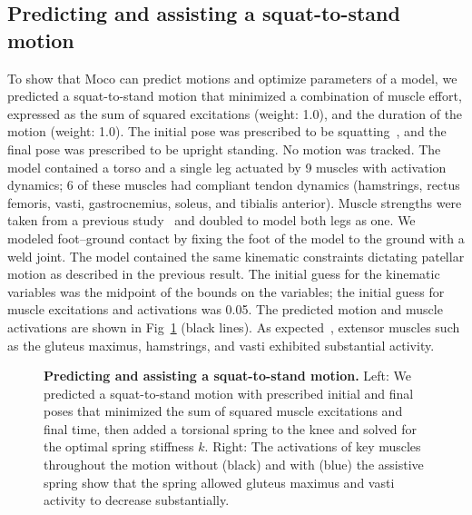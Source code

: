 \documentclass[10pt,letterpaper]{article}
\begin{document}
\subsection*{Predicting and assisting a squat-to-stand motion}

To show that Moco can predict motions and optimize parameters of a model, we predicted a squat-to-stand motion that minimized a combination of muscle effort, expressed as the sum of squared excitations (weight: 1.0), and the duration of the motion (weight: 1.0). The initial pose was prescribed to be squatting~\cite{Fregly:2015}, and the final pose was prescribed to be upright standing. No motion was tracked. The model contained a torso and a single leg actuated by 9 muscles with activation dynamics; 6 of these muscles had compliant tendon dynamics (hamstrings, rectus femoris, vasti, gastrocnemius, soleus, and tibialis anterior). Muscle strengths were taken from a previous study~\cite{Ong:2019} and doubled to model both legs as one. We modeled foot--ground contact by fixing the foot of the model to the ground with a weld joint. The model contained the same kinematic constraints dictating patellar motion as described in the previous result. The initial guess for the kinematic variables was the midpoint of the bounds on the variables; the initial guess for muscle excitations and activations was 0.05. The predicted motion and muscle activations are shown in Fig~\ref{squattostand} (black lines). As expected~\cite{Yavuz:2017}, extensor muscles such as the gluteus maximus, hamstrings, and vasti exhibited substantial activity.

\begin{figure}[!h]
        \centering
        \caption{{\bf Predicting and assisting a squat-to-stand motion.}
            Left: We predicted a squat-to-stand motion with prescribed initial and final poses that minimized the sum of squared muscle excitations and final time, then added a torsional spring to the knee and solved for the optimal spring stiffness $k$. Right: The activations of key muscles throughout the motion without (black) and with (blue) the assistive spring show that the spring allowed gluteus maximus and vasti activity to decrease substantially.
        }
        \label{squattostand}
\end{figure}
\end{document}
